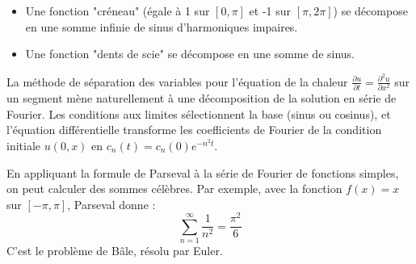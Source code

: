 \begin{example}
    \begin{itemize}
        \item Une fonction "créneau" (égale à 1 sur $[0, \pi]$ et -1 sur $[\pi, 2\pi]$) se décompose en une somme infinie de sinus d'harmoniques impaires.
        \item Une fonction "dents de scie" se décompose en une somme de sinus.
    \end{itemize}
\end{example}

\begin{application}
    La méthode de séparation des variables pour l'équation de la chaleur $\frac{\partial u}{\partial t} = \frac{\partial^2 u}{\partial x^2}$ sur un segment mène naturellement à une décomposition de la solution en série de Fourier. Les conditions aux limites sélectionnent la base (sinus ou cosinus), et l'équation différentielle transforme les coefficients de Fourier de la condition initiale $u(0,x)$ en $c_n(t) = c_n(0)e^{-n^2 t}$.
\end{application}

\begin{application}
    En appliquant la formule de Parseval à la série de Fourier de fonctions simples, on peut calculer des sommes célèbres. Par exemple, avec la fonction $f(x)=x$ sur $[-\pi, \pi]$, Parseval donne :
    $$ \sum_{n=1}^\infty \frac{1}{n^2} = \frac{\pi^2}{6} $$
    C'est le problème de Bâle, résolu par Euler.
\end{application}